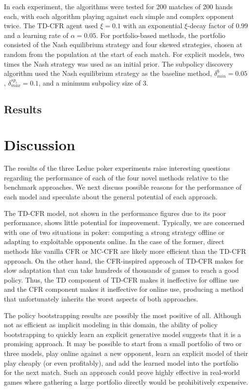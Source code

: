\documentclass{aamas2013}
\begin{document}
    In each experiment, the algorithms were tested for 200 matches of 200 hands each, with each algorithm playing against each simple and complex opponent twice. The TD-CFR agent used $\xi=0.1$ with an exponential $\xi$-decay factor of $0.99$ and a learning rate of $\alpha=0.05$. For portfolio-based methods, the portfolio consisted of the Nash equilibrium strategy and four skewed strategies, chosen at random from the population at the start of each match. For explicit models, two times the Nash strategy was used as an initial prior. The subpolicy discovery algorithm used the Nash equilibrium strategy as the baseline method, $\delta_{min}^{b}=0.05$, $\delta_{max}^{sp_i}=0.1$, and a minimum subpolicy size of 3.

    \subsection{Results}


\section{Discussion}
The results of the three Leduc poker experiments raise interesting questions regarding the performance of each of the four novel methods relative to the benchmark approaches. We next discuss possible reasons for the performance of each model and speculate about the general potential of each approach.

The TD-CFR model, not shown in the performance figures due to its poor performance, shows little potential for improvement. Typically, we are concerned with one of two situations in poker: computing a strong strategy offline or adapting to exploitable opponents online. In the case of the former, direct methods like vanilla CFR or MC-CFR are likely more efficient than the TD-CFR approach. On the other hand, the CFR-inspired approach of TD-CFR makes for slow adaptation that can take hundreds of thousands of games to reach a good policy. Thus, the TD component of TD-CFR makes it ineffective for offline use and the CFR component makes it ineffective for online use, producing a method that unfortunately inherits the worst aspects of both approaches.

The policy bootstrapping results are possibly the most positive of all. Although not as efficient as implicit modeling in this domain, the ability of policy bootstrapping to quickly learn an explicit generative model suggests that it is a promising approach. It may be possible to start from a small portfolio of two or three models, play online against a new opponent, learn an explicit model of their play cheaply (or even profitably), and add the learned model into the portfolio for the next match. Such an approach could prove highly effective in real-world games where gathering a large portfolio directly would be prohibitively expensive.
\end{document}
